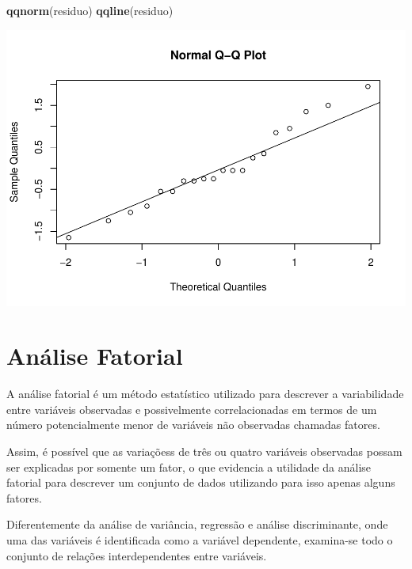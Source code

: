 \documentclass[12pt,brazil,]{book}
\newenvironment{Shaded}{\begin{snugshade}}{\end{snugshade}}
\newcommand{\KeywordTok}[1]{\textcolor[rgb]{0.13,0.29,0.53}{\textbf{#1}}}
\newcommand{\NormalTok}[1]{#1}
\begin{document}
\begin{Shaded}
\begin{Highlighting}[]
\KeywordTok{qqnorm}\NormalTok{(residuo)}
\KeywordTok{qqline}\NormalTok{(residuo)}
\end{Highlighting}
\end{Shaded}

\includegraphics{02-Delinexp_files/figure-latex/unnamed-chunk-15-1.pdf}

\printbibliography[segment=\therefsegment,heading=subbibliography]

\hypertarget{analise-fatorial}{%
\chapter{Análise Fatorial}\label{analise-fatorial}}

A análise fatorial é um método estatístico utilizado para descrever a
variabilidade entre variáveis observadas e possivelmente correlacionadas
em termos de um número potencialmente menor de variáveis não observadas
chamadas fatores.

Assim, é possível que as variaçõess de três ou quatro variáveis
observadas possam ser explicadas por somente um fator, o que evidencia a
utilidade da análise fatorial para descrever um conjunto de dados
utilizando para isso apenas alguns fatores.

Diferentemente da análise de variância, regressão e análise
discriminante, onde uma das variáveis é identificada como a variável
dependente, examina-se todo o conjunto de relações interdependentes
entre variáveis.
\end{document}
